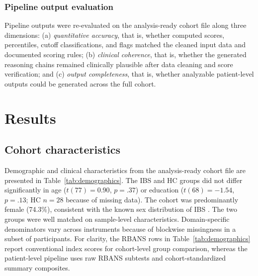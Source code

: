 \documentclass[11pt,a4paper]{article}
\begin{document}
\subsubsection{Pipeline output evaluation}

Pipeline outputs were re-evaluated on the analysis-ready cohort file along three dimensions: (a) \textit{quantitative accuracy}, that is, whether computed scores, percentiles, cutoff classifications, and flags matched the cleaned input data and documented scoring rules; (b) \textit{clinical coherence}, that is, whether the generated reasoning chains remained clinically plausible after data cleaning and score verification; and (c) \textit{output completeness}, that is, whether analyzable patient-level outputs could be generated across the full cohort.


\section{Results}
\label{sec:results}

\subsection{Cohort characteristics}

Demographic and clinical characteristics from the analysis-ready cohort file are presented in Table~\ref{tab:demographics}. The IBS and HC groups did not differ significantly in age ($t(77) = 0.90$, $p = .37$) or education ($t(68) = -1.54$, $p = .13$; HC $n = 28$ because of missing data). The cohort was predominantly female (74.3\%), consistent with the known sex distribution of IBS \citep{Sperber2021}. The two groups were well matched on sample-level characteristics. Domain-specific denominators vary across instruments because of blockwise missingness in a subset of participants. For clarity, the RBANS rows in Table~\ref{tab:demographics} report conventional index scores for cohort-level group comparison, whereas the patient-level pipeline uses raw RBANS subtests and cohort-standardized summary composites.
\end{document}
